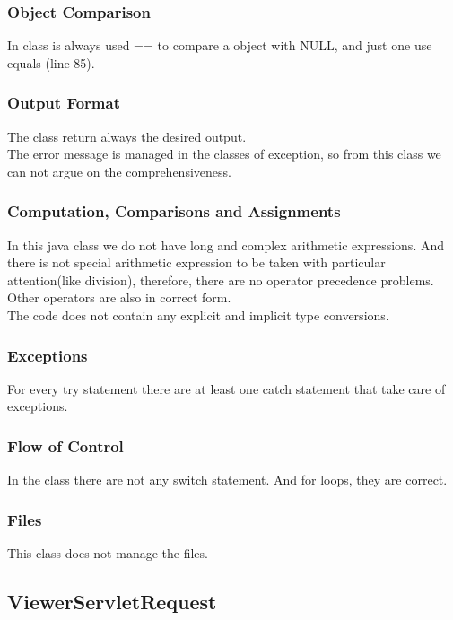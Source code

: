 \documentclass{article}
\begin{document}
\subsubsection{Object Comparison}
In class is always used == to compare a object with NULL, and just one use equals (line 85).
\subsubsection{Output Format}
The class return always the desired output.\\
The error message is managed in the classes of exception, so from this class we can not argue on the comprehensiveness.
\subsubsection{Computation, Comparisons and Assignments}
In this java class we do not have long and complex arithmetic expressions. And there is not special arithmetic expression to be taken with particular attention(like division), therefore, there are no operator precedence problems.\\
Other operators are also in correct form.\\
The code does not contain any explicit and implicit type conversions.
\subsubsection{Exceptions}
For every try statement there are at least one catch statement that take care of exceptions.
\subsubsection{Flow of Control}
In the class there are not any switch statement. And for loops,  they are correct.
\subsubsection{Files}
This class does not manage the files.

\newpage
 \subsection{ViewerServletRequest}
\end{document}
